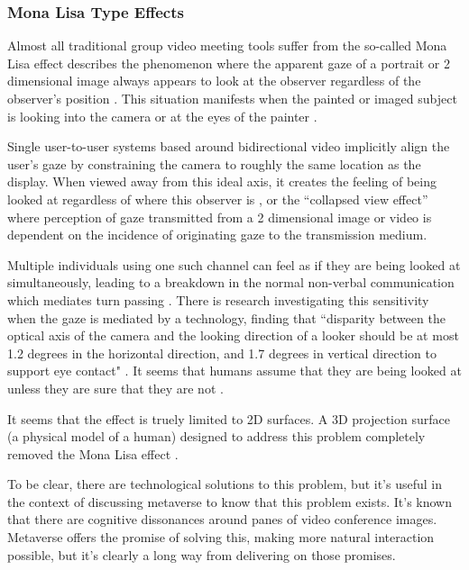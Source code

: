\subsubsection{Mona Lisa Type Effects}
Almost all traditional group video meeting tools suffer from the so-called Mona Lisa effect describes the phenomenon where the apparent gaze of a portrait or 2 dimensional image always appears to look at the observer regardless of the observer's position \cite{Vishwanath2005, Anstis1969, Wollaston1824}. This situation manifests when the painted or imaged subject is looking into the camera or at the eyes of the painter \cite{Loomis2008, Fullwood2006}.\par
Single user-to-user systems based around bidirectional video implicitly align the user's gaze by constraining the camera to roughly the same location as the display. When viewed away from this ideal axis, it creates the feeling of being looked at regardless of where this observer is \cite{Moubayed2012, Vishwanath2005, Anstis1969, Wollaston1824}, or the ``collapsed view effect'' \cite{Nguyen2005} where perception of gaze transmitted from a 2 dimensional image or video is dependent on the incidence of originating gaze to the transmission medium. \par
Multiple individuals using one such channel can feel as if they are being looked at simultaneously, leading to a breakdown in the normal non-verbal communication which mediates turn passing \cite{Vertegaal2002}.    
There is research investigating this sensitivity when the gaze is mediated by a technology, finding that ``disparity between the optical axis of the camera and the looking direction of a looker should be at most 1.2 degrees in the horizontal direction, and 1.7 degrees in vertical direction to support eye contact" \cite{Van_Eijk2010, Bock2008}. It seems that humans assume that they are being looked at unless they are sure that they are not \cite{Chen2002}.\par
It seems that the effect is truely limited to 2D surfaces. A 3D projection surface (a physical model of a human) designed to address this problem completely removed the Mona Lisa effect \cite{Moubayed2012}.\par
To be clear, there are technological solutions to this problem, but it's useful in the context of discussing metaverse to know that this problem exists. It's known that there are cognitive dissonances around panes of video conference images. Metaverse offers the promise of solving this, making more natural interaction possible, but it's clearly a long way from delivering on those promises.

